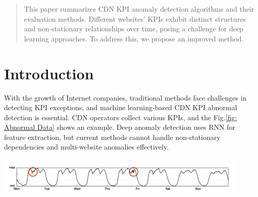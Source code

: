 \documentclass[a0,portrait]{a0poster}
\begin{document}
\begin{multicols}{2} %



\color{DarkRed}

\begin{abstract}
	This paper summarizes CDN KPI anomaly detection algorithms and their evaluation methods. Different websites' KPIs exhibit distinct structures and non-stationary relationships over time, posing a challenge for deep learning approaches. To address this, we propose an improved method.
\end{abstract}


\color{Black}
\section*{Introduction}

\quad With the growth of Internet companies, traditional methods face challenges in detecting KPI exceptions, and machine learning-based CDN KPI abnormal detection is essential\cite{b1}. CDN operators collect various KPIs, and the Fig.\ref{fig: Abnormal Data} shows an example. Deep anomaly detection uses RNN for feature extraction, but current methods cannot handle non-stationary dependencies and multi-website anomalies effectively.

\begin{center}\vspace{1cm}
	\includegraphics[width=0.8\linewidth]{abnormal_data}
\end{center}\vspace{1cm}




\end{multicols}
\end{document}
